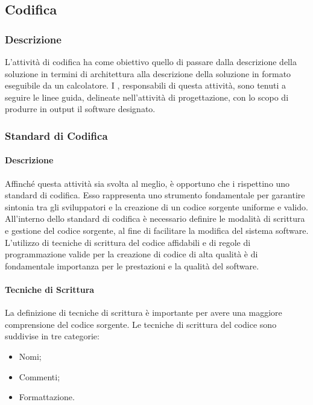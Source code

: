 \subsection{Codifica}

\subsubsection{Descrizione}
L'attività di codifica ha come obiettivo quello di passare dalla descrizione della soluzione in termini di architettura alla descrizione della soluzione in formato eseguibile da un calcolatore. I \textit{\Progrs}, responsabili di questa attività, sono tenuti a seguire le linee guida, delineate nell'attività di progettazione, con lo scopo di produrre in output il software designato.

\subsubsection{Standard di Codifica}
\paragraph{Descrizione}
Affinché questa attività sia svolta al meglio, è opportuno che i \textit{\Progrs} rispettino uno standard di codifica.
Esso rappresenta uno strumento fondamentale per garantire sintonia tra gli sviluppatori e la creazione di un codice sorgente uniforme e valido.
All'interno dello standard di codifica è necessario definire le modalità di scrittura e gestione del codice sorgente, al fine di facilitare la modifica del sistema software.
L'utilizzo di tecniche di scrittura del codice affidabili e di regole di programmazione valide per la creazione di codice di alta qualità è di fondamentale importanza per le prestazioni e la qualità del software.


\paragraph{Tecniche di Scrittura}
La definizione di tecniche di scrittura è importante per avere una maggiore comprensione del codice sorgente.
Le tecniche di scrittura del codice sono suddivise in tre categorie:
\begin{itemize}
\item
Nomi;
\item
Commenti;
\item
Formattazione.
\end{itemize}


